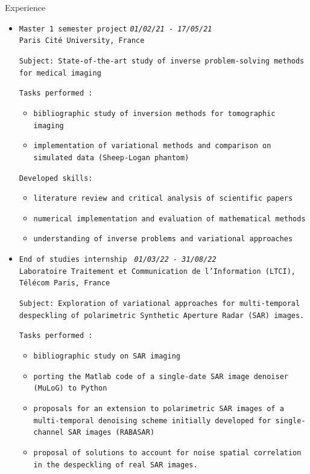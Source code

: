 \documentclass{resume} %
\begin{document}
\begin{rSection}{Experience}
\begin{itemize}
\item \texttt{Master 1 semester project} \hfill \texttt{\em 01/02/21 - 17/05/21}\\
\texttt{Paris Cité University, France}

\texttt{Subject: State-of-the-art study of inverse problem-solving methods for medical imaging}

\texttt{Tasks performed :}
\begin{itemize}
    \item \texttt{bibliographic study of inversion methods for tomographic imaging}
    \item \texttt{implementation of variational methods  and comparison on simulated data (Sheep-Logan phantom)}
\end{itemize}

\texttt{Developed skills:}
\begin{itemize}
\item \texttt{literature review and critical analysis of scientific papers}
\item \texttt{numerical implementation and evaluation of mathematical methods}
\item \texttt{understanding of inverse problems and variational approaches}
\end{itemize}

\item \texttt{End of studies internship } \hfill \texttt{\em 01/03/22 - 31/08/22}\\
\texttt{Laboratoire Traitement et Communication de l’Information (LTCI), Télécom Paris, France}

\texttt{Subject: Exploration of variational approaches for multi-temporal despeckling of polarimetric Synthetic Aperture Radar (SAR) images.}

\texttt{Tasks performed :}
\begin{itemize}
    \item \texttt{bibliographic study on SAR imaging}
    \item \texttt{porting the Matlab code of a single-date SAR image denoiser (MuLoG) to Python}
    \item \texttt{proposals for an extension to polarimetric SAR images of a multi-temporal denoising scheme initially developed for single-channel SAR images (RABASAR)}
    \item \texttt{proposal of solutions to account for noise spatial correlation in the despeckling of real SAR images.}
\end{itemize}


\end{itemize}
\end{rSection}
\end{document}
